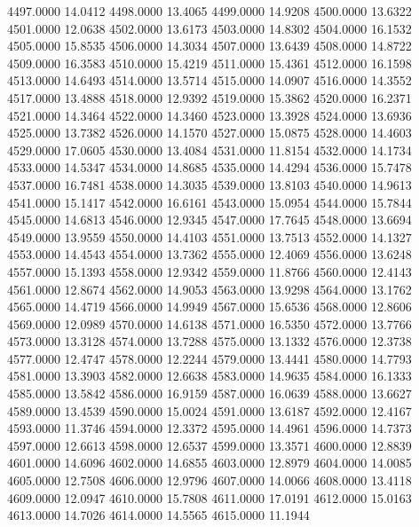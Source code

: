 4497.0000     14.0412
4498.0000     13.4065
4499.0000     14.9208
4500.0000     13.6322
4501.0000     12.0638
4502.0000     13.6173
4503.0000     14.8302
4504.0000     16.1532
4505.0000     15.8535
4506.0000     14.3034
4507.0000     13.6439
4508.0000     14.8722
4509.0000     16.3583
4510.0000     15.4219
4511.0000     15.4361
4512.0000     16.1598
4513.0000     14.6493
4514.0000     13.5714
4515.0000     14.0907
4516.0000     14.3552
4517.0000     13.4888
4518.0000     12.9392
4519.0000     15.3862
4520.0000     16.2371
4521.0000     14.3464
4522.0000     14.3460
4523.0000     13.3928
4524.0000     13.6936
4525.0000     13.7382
4526.0000     14.1570
4527.0000     15.0875
4528.0000     14.4603
4529.0000     17.0605
4530.0000     13.4084
4531.0000     11.8154
4532.0000     14.1734
4533.0000     14.5347
4534.0000     14.8685
4535.0000     14.4294
4536.0000     15.7478
4537.0000     16.7481
4538.0000     14.3035
4539.0000     13.8103
4540.0000     14.9613
4541.0000     15.1417
4542.0000     16.6161
4543.0000     15.0954
4544.0000     15.7844
4545.0000     14.6813
4546.0000     12.9345
4547.0000     17.7645
4548.0000     13.6694
4549.0000     13.9559
4550.0000     14.4103
4551.0000     13.7513
4552.0000     14.1327
4553.0000     14.4543
4554.0000     13.7362
4555.0000     12.4069
4556.0000     13.6248
4557.0000     15.1393
4558.0000     12.9342
4559.0000     11.8766
4560.0000     12.4143
4561.0000     12.8674
4562.0000     14.9053
4563.0000     13.9298
4564.0000     13.1762
4565.0000     14.4719
4566.0000     14.9949
4567.0000     15.6536
4568.0000     12.8606
4569.0000     12.0989
4570.0000     14.6138
4571.0000     16.5350
4572.0000     13.7766
4573.0000     13.3128
4574.0000     13.7288
4575.0000     13.1332
4576.0000     12.3738
4577.0000     12.4747
4578.0000     12.2244
4579.0000     13.4441
4580.0000     14.7793
4581.0000     13.3903
4582.0000     12.6638
4583.0000     14.9635
4584.0000     16.1333
4585.0000     13.5842
4586.0000     16.9159
4587.0000     16.0639
4588.0000     13.6627
4589.0000     13.4539
4590.0000     15.0024
4591.0000     13.6187
4592.0000     12.4167
4593.0000     11.3746
4594.0000     12.3372
4595.0000     14.4961
4596.0000     14.7373
4597.0000     12.6613
4598.0000     12.6537
4599.0000     13.3571
4600.0000     12.8839
4601.0000     14.6096
4602.0000     14.6855
4603.0000     12.8979
4604.0000     14.0085
4605.0000     12.7508
4606.0000     12.9796
4607.0000     14.0066
4608.0000     13.4118
4609.0000     12.0947
4610.0000     15.7808
4611.0000     17.0191
4612.0000     15.0163
4613.0000     14.7026
4614.0000     14.5565
4615.0000     11.1944
